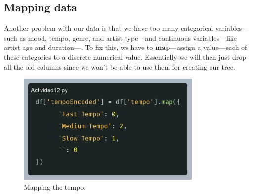 \documentclass[10pt]{article}
\begin{document}
\newpage
\subsection{Mapping data}
Another problem with our data is that we have too many categorical variables---such as mood, tempo, genre, and artist type---and continuous variables---like artist age and duration---. To fix this, we have to \textbf{map}---assign a value---each of these categories to a discrete numerical value. Essentially we will then just drop all the old columns since we won't be able to use them for creating our tree.
\begin{figure}[h]
    \centering
    \includegraphics[width=90mm]{2025-03-30-21-14-04.png}
    \caption{Mapping the tempo.}
\end{figure}

\newpage
\end{document}
